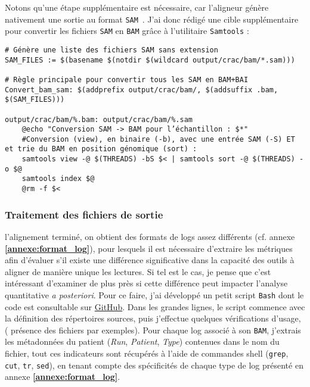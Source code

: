 Notons qu'une étape supplémentaire est nécessaire, car l'aligneur génère nativement une sortie au format \texttt{SAM}~\textsuperscript{\cite{samtools_hts_specs_2024}}. J'ai donc rédigé une cible supplémentaire pour convertir les fichiers \texttt{SAM} en \texttt{BAM} grâce à l'utilitaire \texttt{Samtools} :

\begin{lstlisting}[style=makefileStyle, label={lst:CRACAlign}, caption={\underline{Cible \texttt{Crac\_Paire} pour générer les \texttt{BAM} avec CRAC}}]
# Génère une liste des fichiers SAM sans extension
SAM_FILES := $(basename $(notdir $(wildcard output/crac/bam/*.sam)))

# Règle principale pour convertir tous les SAM en BAM+BAI
Convert_bam_sam: $(addprefix output/crac/bam/, $(addsuffix .bam, $(SAM_FILES)))

output/crac/bam/%.bam: output/crac/bam/%.sam
	@echo "Conversion SAM -> BAM pour l’échantillon : $*"
	#Conversion (view), en binaire (-b), avec une entrée SAM (-S) ET et trie du BAM en position génomique (sort) :
	samtools view -@ $(THREADS) -bS $< | samtools sort -@ $(THREADS) -o $@
	samtools index $@
	@rm -f $<
\end{lstlisting}

\subsubsection{Traitement des fichiers de sortie}

l'alignement terminé, on obtient des formats de logs assez différents (cf. annexe \textbf{\ref{annexe:format_log}}), pour lesquels il est nécessaire d’extraire les métriques afin d’évaluer s’il existe une différence significative dans la capacité des outils à aligner de manière unique les lectures. Si tel est le cas, je pense que c'est intéressant d’examiner de plus près si cette différence peut impacter l'analyse quantitative \textit{a posteriori}. Pour ce faire, j’ai développé un petit script \texttt{Bash} dont le code est consultable sur \href{https://github.com/MickaelCQ/M1_ALS_RnaSeq/blob/main/3.Home_script/Fusion_Stats_BAM.sh}{GitHub}. Dans les grandes lignes, le script commence avec la définition des répertoires sources, puis j'effectue quelques vérifications d’usage, ( présence des fichiers par exemples). Pour chaque log associé à son \texttt{BAM}, j’extrais les métadonnées du patient (\textit{Run}, \textit{Patient}, \textit{Type}) contenues dans le nom du fichier, tout ces indicateurs sont récupérés à l’aide de commandes shell (\texttt{grep}, \texttt{cut}, \texttt{tr}, \texttt{sed}), en tenant compte des spécificités de chaque type de log présenté en annexe \textbf{\ref{annexe:format_log}}. \\

